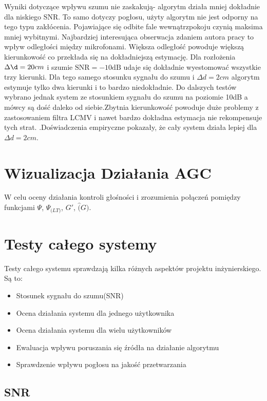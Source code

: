 Wyniki dotyczące wpływu szumu nie zaskakują- algorytm działa mniej dokładnie dla niskiego SNR. To samo dotyczy pogłosu, użyty algorytm nie jest odporny na tego typu zakłócenia. Pojawiające się odbite fale wewnątrzpokoju czynią maksima mniej wybitnymi. Najbardziej interesująca obserwacja zdaniem autora pracy to wpływ odległości między mikrofonami. Większa odległość powoduje większą kierunkowość co przekłada się na dokładniejszą estymację. Dla rozłożenia $\Delta \d = 20cm$ i szumie $\mathrm{SNR}=-10\mathrm{dB}$ udaje się dokładnie wyestomować wszystkie trzy kierunki. Dla tego samego stosunku sygnału do szumu i $\Delta d = 2cm$ algorytm estymuje tylko dwa kierunki i to bardzo niedokładnie. Do dalszych testów wybrano jednak system ze stosunkiem sygnału do szumu na poziomie 10dB a mówcy są dość daleko od siebie.Zbytnia kierunkowość powoduje duże problemy z zastosowaniem filtra LCMV i nawet bardzo dokładna estymacja nie rekompensuje tych strat. .Doświadczenia empiryczne pokazały, że cały system działa lepiej dla $\Delta d = 2cm$.

\newpage

\section{Wizualizacja Działania AGC}

W celu oceny działania kontroli głośności i zrozumienia połączeń pomiędzy funkcjami $\Psi$, $\Psi_{\mathrm(LT)}$, $G'$, $\widehat(G)$. 

\section{Testy całego systemy}

Testy całego systemu sprawdzają kilka różnych aspektów projektu inżynierskiego. Są to:

\begin{itemize}
    \item Stosunek sygnału do szumu(SNR)
    \item Ocena działania systemu dla jednego użytkownika
    \item Ocena działania systemu dla wielu użytkowników
    \item Ewaluacja wpływu poruszania się źródła na działanie algorytmu
    \item Sprawdzenie wpływu pogłosu na jakość przetwarzania
    
\end{itemize}
\subsection{SNR}

